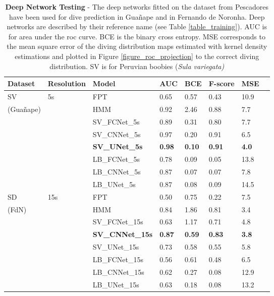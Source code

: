 \documentclass{article}
\begin{document}
\begin{table}[h]
 \caption{\textbf{Deep Network Testing} - The deep networks fitted on the dataset from Pescadores have been used for dive prediction in Guañape and in Fernando de Noronha. Deep networks are described by their reference name (see Table \ref{table_training}). AUC is for area under the roc curve. BCE is the binary cross entropy. MSE corresponds to the mean square error of the diving distribution maps estimated with kernel density estimations and plotted in Figure \ref{figure_roc_projection} to the correct diving distribution. SV is for Peruvian boobies (\textit{Sula variegata)}}
  \centering
  \begin{tabular}{llllllll}
    \toprule
    Dataset  &  Resolution &  Model & AUC & BCE & F-score & MSE \\
    \midrule
    SV      & 5s  & FPT         & 0.65 & 0.57 & 0.43 & 10.9 \\
  (Guañape) &   & HMM         & 0.92 & 2.46 & 0.88 & 7.7  \\
            &     & SV\_FCNet\_5s & 0.89 & 0.31 & 0.80 & 7.7  \\
            &     & SV\_CNNet\_5s & 0.97 & 0.20 & 0.91 & 6.5  \\
            &     & {\bf SV\_UNet\_5s}  &  {\bf 0.98} &  {\bf 0.10} &  {\bf 0.91} & {\bf 4.0}  \\
            &     & LB\_FCNet\_5s & 0.78 & 0.09 & 0.05 & 13.8 \\
            &     & LB\_CNNet\_5s & 0.87 & 0.07 & 0.07 & 7.8 \\
            &     & LB\_UNet\_5s & 0.87 & 0.08 & 0.09 &14.5 \\
    \midrule
    SD      & 15s & FPT           & 0.50 & 0.75 & 0.22 & 7.5 \\
    (FdN)   &     & HMM           & 0.84 & 1.86 & 0.81 & 3.4  \\
            &     & SV\_FCNet\_15s  & 0.63 & 1.17 & 0.71 & 4.8  \\
            &     &  {\bf SV\_CNNet\_15s}  &  {\bf 0.87} &  {\bf 0.59} &  {\bf 0.83} & {\bf 3.8}  \\
            &     & SV\_UNet\_15s   & 0.73 & 0.58 & 0.55 & 5.8  \\
            &     & LB\_FCNet\_15s  & 0.56 & 0.61 & 0.48 & 6.5  \\
            &     & LB\_CNNet\_15s  & 0.62 & 0.27 & 0.08 & 12.9  \\
            &     & LB\_UNet\_15s   & 0.63 & 0.18 & 0.08 & 13.2  \\
    \bottomrule
  \end{tabular}
  \label{table_projection}
\end{table}
\end{document}
